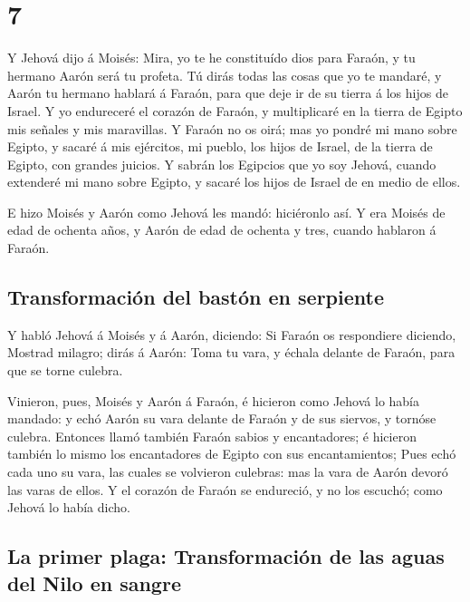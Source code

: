 \hypertarget{section-6}{%
\section{7}\label{section-6}}

 Y Jehová dijo á Moisés: Mira, yo te he constituído dios
para Faraón, y tu hermano Aarón será tu profeta.  Tú dirás
todas las cosas que yo te mandaré, y Aarón tu hermano hablará á Faraón,
para que deje ir de su tierra á los hijos de Israel.  Y yo
endureceré el corazón de Faraón, y multiplicaré en la tierra de Egipto
mis señales y mis maravillas.  Y Faraón no os oirá; mas yo
pondré mi mano sobre Egipto, y sacaré á mis ejércitos, mi pueblo, los
hijos de Israel, de la tierra de Egipto, con grandes juicios.
 Y sabrán los Egipcios que yo soy Jehová, cuando extenderé
mi mano sobre Egipto, y sacaré los hijos de Israel de en medio de ellos.

 E hizo Moisés y Aarón como Jehová les mandó: hiciéronlo
así.  Y era Moisés de edad de ochenta años, y Aarón de
edad de ochenta y tres, cuando hablaron á Faraón.

\hypertarget{transformaciuxf3n-del-bastuxf3n-en-serpiente}{%
\subsection{Transformación del bastón en
serpiente}\label{transformaciuxf3n-del-bastuxf3n-en-serpiente}}

 Y habló Jehová á Moisés y á Aarón, diciendo:
 Si Faraón os respondiere diciendo, Mostrad milagro; dirás
á Aarón: Toma tu vara, y échala delante de Faraón, para que se torne
culebra.

 Vinieron, pues, Moisés y Aarón á Faraón, é hicieron como
Jehová lo había mandado: y echó Aarón su vara delante de Faraón y de sus
siervos, y tornóse culebra.  Entonces llamó también
Faraón sabios y encantadores; é hicieron también lo mismo los
encantadores de Egipto con sus encantamientos;  Pues echó
cada uno su vara, las cuales se volvieron culebras: mas la vara de Aarón
devoró las varas de ellos.  Y el corazón de Faraón se
endureció, y no los escuchó; como Jehová lo había dicho.

\hypertarget{la-primer-plaga-transformaciuxf3n-de-las-aguas-del-nilo-en-sangre}{%
\subsection{La primer plaga: Transformación de las aguas del Nilo en
sangre}\label{la-primer-plaga-transformaciuxf3n-de-las-aguas-del-nilo-en-sangre}}

